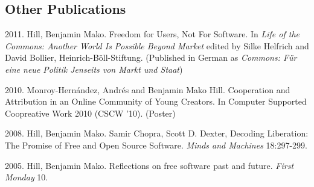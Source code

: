 \documentclass[10pt]{article}
\newenvironment{cvlist}{
\begin{list}{}{\leftmargin=3.0em \itemindent=-3.0em}
  \setlength{\itemsep}{0pt}
  \setlength{\parskip}{0em}
  \setlength{\parsep}{1em}
  \setlength{\parindent}{0em}}
{\vspace{1em}
\end{list}}
\begin{document}


\subsection{Other Publications}
\begin{cvlist}
\item 2011. Hill, Benjamin Mako. Freedom for Users, Not For Software.
  In \emph{Life of the Commons: Another World Is Possible
  Beyond Market} edited by Silke Helfrich and David Bollier,
  Heinrich-Böll-Stiftung. (Published in German as
  \emph{Commons: Für eine neue Politik Jenseits von Markt und Staat})
\item 2010. Monroy-Hernández, Andrés and Benjamin Mako
  Hill. Cooperation and Attribution in an Online Community of
  Young Creators. In Computer Supported Coopreative Work 2010
  (CSCW '10). (Poster)
\item 2008. Hill, Benjamin Mako. Samir Chopra, Scott
  D. Dexter, Decoding Liberation: The Promise of Free and Open Source
  Software. \emph{Minds and Machines} 18:297-299.
\item 2005. Hill, Benjamin Mako. Reflections on free
  software past and future. \emph{First Monday} 10.

\end{cvlist}
\end{document}
